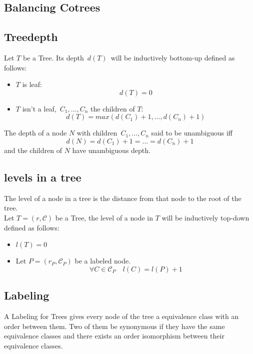 \documentclass[a4paper,12pt]{article}
\begin{document}
	
	\subsection{Balancing Cotrees}
	\subsection{Treedepth}
	Let $T$ be a Tree. Its depth $\,d(T)\,$ will be inductively bottom-up defined as follows:
	\begin{itemize}
		\item $T$ is leaf: \[d(T)=0\]
		\item $T$ isn't a leaf,\, $C_1,...,C_n$ the children of $T$: \[d(T)= max(d(C_1)+1,...,d(C_n)+1)\]
	\end{itemize}
	\vspace{0.5cm}
	The depth of a node $N$ with children $\, C_1,...,C_n$ said to be unambiguous iff
	\[d(N) = d(C_1)+1= ...=d(C_n)+1\]
	and the children of $N$ have unambiguous depth.
	
	\subsection{levels in a tree}
	The level of a node in  a tree is the distance from that node to the root of the tree.\\
	Let $T=(r,\mathcal{C})$ be a Tree, the level of a node in $T$ will be inductively top-down defined as follows:
	\begin{itemize}
		\item $l(T)=0$\\
		\item Let $P=(r_P,\mathcal{C}_P)$ be a labeled node. \[\forall C\in\mathcal{C}_P\quad l(C)= l(P) + 1\]
	\end{itemize}
	\subsection{Labeling}
	A Labeling for Trees gives every node of the tree a equivalence class with an order between them. Two of them be synonymous if they have the same equivalence classes and there exists an order isomorphism between their equivalence classes.
\end{document}
